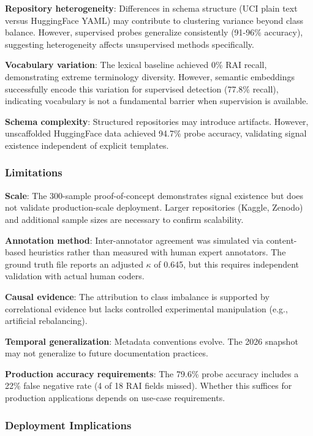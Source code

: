 \textbf{Repository heterogeneity}: Differences in schema structure (UCI plain text versus HuggingFace YAML) may contribute to clustering variance beyond class balance. However, supervised probes generalize consistently (91-96\% accuracy), suggesting heterogeneity affects unsupervised methods specifically.

\textbf{Vocabulary variation}: The lexical baseline achieved 0\% RAI recall, demonstrating extreme terminology diversity. However, semantic embeddings successfully encode this variation for supervised detection (77.8\% recall), indicating vocabulary is not a fundamental barrier when supervision is available.

\textbf{Schema complexity}: Structured repositories may introduce artifacts. However, unscaffolded HuggingFace data achieved 94.7\% probe accuracy, validating signal existence independent of explicit templates.

\subsubsection{Limitations}

\textbf{Scale}: The 300-sample proof-of-concept demonstrates signal existence but does not validate production-scale deployment. Larger repositories (Kaggle, Zenodo) and additional sample sizes are necessary to confirm scalability.

\textbf{Annotation method}: Inter-annotator agreement was simulated via content-based heuristics rather than measured with human expert annotators. The ground truth file reports an adjusted $\kappa$ of 0.645, but this requires independent validation with actual human coders.

\textbf{Causal evidence}: The attribution to class imbalance is supported by correlational evidence but lacks controlled experimental manipulation (e.g., artificial rebalancing).

\textbf{Temporal generalization}: Metadata conventions evolve. The 2026 snapshot may not generalize to future documentation practices.

\textbf{Production accuracy requirements}: The 79.6\% probe accuracy includes a 22\% false negative rate (4 of 18 RAI fields missed). Whether this suffices for production applications depends on use-case requirements.

\subsubsection{Deployment Implications}

